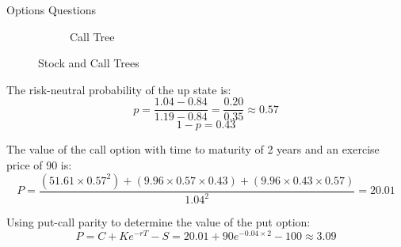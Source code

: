 \begin{examplebox}{Options Questions}
\begin{figure}[H]
\begin{subfigure}[b]{0.48\textwidth}
        \caption{Call Tree}
    \end{subfigure}
    \caption{Stock and Call Trees}
\end{figure}

The risk-neutral probability of the up state is:
\[
p = \frac{1.04 - 0.84}{1.19 - 0.84} = \frac{0.20}{0.35} \approx 0.57
\]
\[
    1-p =  0.43
\]

The value of the call option with time to maturity of 2 years and an exercise price of 90 is:
\[
P = \frac{(51.61 \times 0.57^2 )+ (9.96 \times 0.57 \times 0.43) + (9.96 \times 0.43 \times 0.57)}{1.04^2} = 20.01
\]

Using put-call parity to determine the value of the put option:
\[
P = C + Ke^{-rT} - S = 20.01 + 90e^{-0.04 \times 2} - 100 \approx 3.09
\]



\end{examplebox}